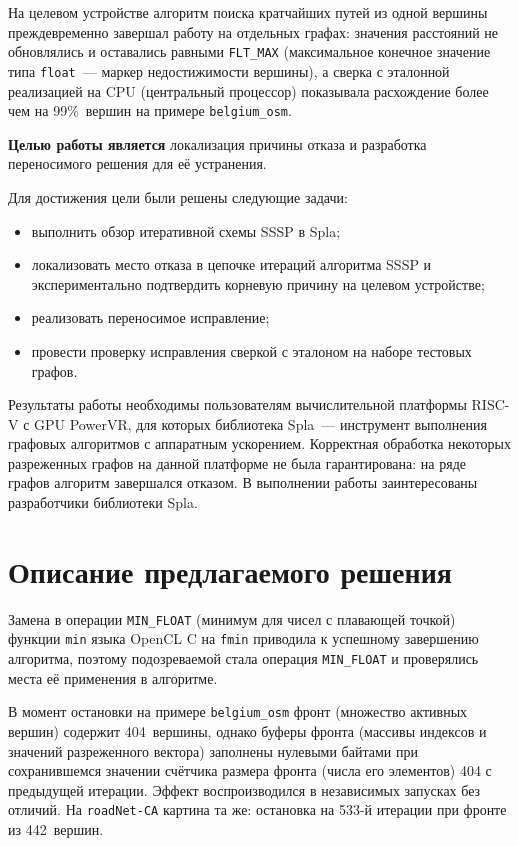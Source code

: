 \documentclass[a4paper]{article}
\begin{document}
На целевом устройстве алгоритм поиска кратчайших путей из одной вершины преждевременно завершал работу на отдельных графах: значения расстояний не обновлялись и оставались равными \texttt{FLT\_MAX} (максимальное конечное значение типа \texttt{float}~--- маркер недостижимости вершины), а сверка с эталонной реализацией на CPU (центральный процессор) показывала расхождение более чем на 99\%~вершин на примере \texttt{belgium\_osm}.

\textbf{Целью работы является} локализация причины отказа и разработка переносимого решения для её устранения.

Для достижения цели были решены следующие задачи:
\begin{itemize}
    \item выполнить обзор итеративной схемы SSSP в Spla;
    \item локализовать место отказа в цепочке итераций алгоритма SSSP и экспериментально подтвердить корневую причину на целевом устройстве;
    \item реализовать переносимое исправление;
    \item провести проверку исправления сверкой с эталоном на наборе тестовых графов.
\end{itemize}

Результаты работы необходимы пользователям вычислительной платформы RISC-V с GPU PowerVR, для которых библиотека Spla~--- инструмент выполнения графовых алгоритмов с аппаратным ускорением. Корректная обработка некоторых разреженных графов на данной платформе не была гарантирована: на ряде графов алгоритм завершался отказом. В выполнении работы заинтересованы разработчики библиотеки Spla.

\section{Описание предлагаемого решения}

Замена в операции \texttt{MIN\_FLOAT} (минимум для чисел с плавающей точкой) функции \texttt{min} языка OpenCL C на \texttt{fmin} приводила к успешному завершению алгоритма, поэтому подозреваемой стала операция \texttt{MIN\_FLOAT} и проверялись места её применения в алгоритме.

В момент остановки на примере \texttt{belgium\_osm} фронт (множество активных вершин) содержит 404~вершины, однако буферы фронта (массивы индексов и значений разреженного вектора) заполнены нулевыми байтами при сохранившемся значении счётчика размера фронта (числа его элементов) 404 с предыдущей итерации. Эффект воспроизводился в независимых запусках без отличий. На \texttt{roadNet-CA} картина та же: остановка на 533-й итерации при фронте из 442~вершин.
\end{document}
